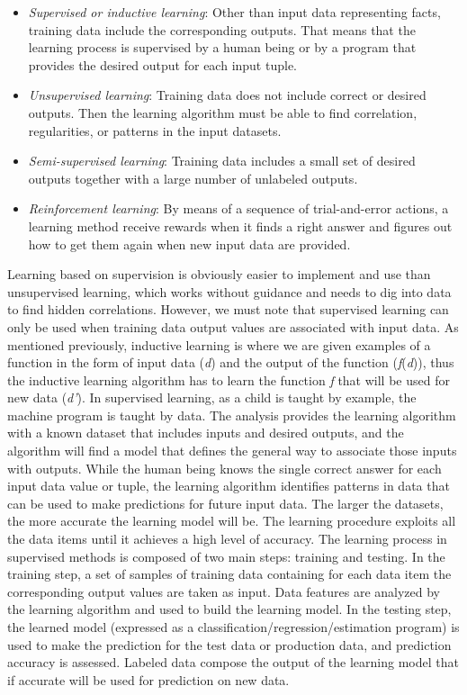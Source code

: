 \begin{itemize}
\item \textit{Supervised or inductive learning}: Other than input data representing facts, training data include the corresponding outputs. That means that the learning process is supervised by a human being or by a program that provides the desired output for each input tuple.
\item \textit{Unsupervised learning}: Training data does not include correct or desired outputs. Then the learning algorithm must be able to find correlation, regularities, or patterns in the input datasets.
\item \textit{Semi-supervised learning}: Training data includes a small set of desired outputs together with a large number\vadjust{\vspace*{12pt}\pagebreak} of unlabeled outputs.
\item \textit{Reinforcement learning}: By means of a sequence of trial-and-error actions, a learning method receive rewards when it finds a right answer and figures out how to get them again when new input data are provided.
\end{itemize}

Learning based on supervision is obviously easier to implement and use than unsupervised learning, which works without guidance and needs to dig into data to find hidden correlations. However, we must note that supervised learning can only be used when training data output values are associated with input data. As mentioned previously, inductive learning is where we are given examples of a function in the form of input data (\textit{d}) and the output of the function (\textit{f}(\textit{d})), thus the inductive learning algorithm has to learn the function \textit{f} that will be used for new data (\textit{d'}). In supervised learning, as a child is taught by example, the machine program is taught by data. The analysis provides the learning algorithm with a known dataset that includes inputs and desired outputs, and the algorithm will find a model that defines the general way to associate those inputs with outputs. While the human being knows the single correct answer for each input data value or tuple, the learning algorithm identifies patterns in data that can be used to make predictions for future input data. The larger the datasets, the more accurate the learning model will be. The learning procedure exploits all the data items until it achieves a high level of accuracy. The learning process in supervised methods is composed of two main steps: training and testing. In the training step, a set of samples of training data containing for each data item the corresponding output values are taken as input. Data features are analyzed by the learning algorithm and used to build the learning model. In the testing step, the learned model (expressed as a classification/{\allowbreak}regression/{\allowbreak}estimation program) is used to make the prediction for the test data or production data, and prediction accuracy is assessed. Labeled data compose the output of the learning model that if accurate will be used for prediction on new data.

